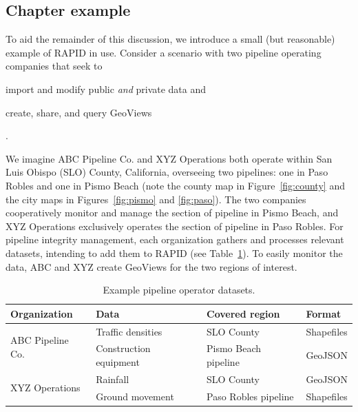 
\subsection{Chapter example}
To aid the remainder of this discussion, we introduce a small (but reasonable) example of RAPID in use. Consider a scenario with two pipeline operating companies that seek to
\begin{enumerate*}[label=\itshape\alph*\upshape)]
\item import and modify public \textit{and} private data and
\item create, share, and query GeoViews
\end{enumerate*}.

We imagine ABC Pipeline Co. and XYZ Operations both operate within San Luis Obispo (SLO) County, California, overseeing two pipelines: one in Paso Robles and one in Pismo Beach (note the county map in Figure~\ref{fig:county} and the city maps in Figures~\ref{fig:pismo}  and \ref{fig:paso}). The two companies cooperatively monitor and manage the section of pipeline in Pismo Beach, and XYZ Operations exclusively operates the section of pipeline in Paso Robles. For pipeline integrity management, each organization gathers and processes relevant datasets, intending to add them to RAPID (see Table~\ref{table:layers}). To easily monitor the data, ABC and XYZ create GeoViews for the two regions of interest.

\begin{table}[ht]

\begin{tabular}{ |l|l|l|l| }
\hline
Organization & Data & Covered region & Format\\
\hline
\multirow{2}{*}{ABC Pipeline Co.}
 & Traffic densities & SLO County & Shapefiles \\ \cline{2-4}
 & Construction equipment & Pismo Beach pipeline & GeoJSON \\ \hline
\multirow{2}{*}{XYZ Operations}
 & Rainfall & SLO County & GeoJSON \\ \cline{2-4}
 & Ground movement & Paso Robles pipeline & Shapefiles \\ \hline
\end{tabular}
\caption{Example pipeline operator datasets.}
\label{table:layers}
\end{table}

